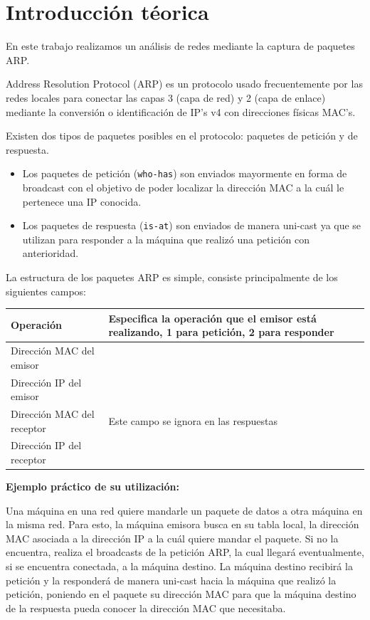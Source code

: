 \documentclass[a4paper, 10pt, twoside]{article}
\begin{document}
\newpage




\section{Introducción téorica}
En este trabajo realizamos un análisis de redes mediante la captura de paquetes ARP.

Address Resolution Protocol (ARP) es un protocolo usado frecuentemente por las redes locales para conectar las capas 3 (capa de red) y 2 (capa de enlace) mediante la conversión o identificación de IP's v4 con direcciones físicas MAC's.

Existen dos tipos de paquetes posibles en el protocolo: paquetes de petición y de respuesta.
\begin{itemize}
	\item Los paquetes de petición (\texttt{who-has}) son enviados mayormente en forma de broadcast con el objetivo de poder localizar la dirección MAC a la cuál le pertenece una IP conocida.
	\item Los paquetes de respuesta (\texttt{is-at}) son enviados de manera uni-cast ya que se utilizan para responder a la máquina que realizó una petición con anterioridad.
\end{itemize}

La estructura de los paquetes ARP es simple, consiste principalmente de los siguientes campos:

\begin{tabular}{| l | p{10cm} |}
	\hline
	Operación & Especifica la operación que el emisor está realizando, 1 para petición, 2 para responder \\ \hline
	Dirección MAC del emisor & \\ \hline
	Dirección IP del emisor & \\ \hline
	Dirección MAC del receptor & Este campo se ignora en las respuestas \\ \hline
	Dirección IP del receptor & \\ \hline
\end{tabular}

\textbf{Ejemplo práctico de su utilización:}

Una máquina en una red quiere mandarle un paquete de datos a otra máquina en la misma red. Para esto, la máquina emisora busca en su tabla local, la dirección MAC asociada a la dirección IP a la cuál quiere mandar el paquete. Si no la encuentra, realiza el broadcasts de la petición ARP, la cual llegará eventualmente, si se encuentra conectada, a la máquina destino. La máquina destino recibirá la petición y la responderá de manera uni-cast hacia la máquina que realizó la petición, poniendo en el paquete su dirección MAC para que la máquina destino de la respuesta pueda conocer la dirección MAC que necesitaba.
\end{document}
